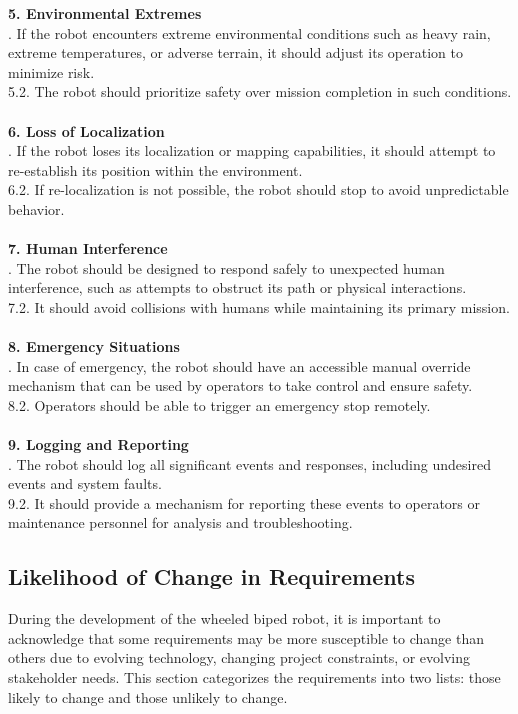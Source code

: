 \documentclass[12pt]{article}
\begin{document}
\noindent\textbf{5. Environmental Extremes}\\
. If the robot encounters extreme environmental conditions such as heavy rain, extreme temperatures, or adverse terrain, it should adjust its operation to minimize risk.\\
5.2. The robot should prioritize safety over mission completion in such conditions.\\\\
\noindent\textbf{6. Loss of Localization}\\
. If the robot loses its localization or mapping capabilities, it should attempt to re-establish its position within the environment.\\
6.2. If re-localization is not possible, the robot should stop to avoid unpredictable behavior.\\\\
\noindent\textbf{7. Human Interference}\\
. The robot should be designed to respond safely to unexpected human interference, such as attempts to obstruct its path or physical interactions.\\
7.2. It should avoid collisions with humans while maintaining its primary mission.\\\\
\noindent\textbf{8. Emergency Situations}\\
. In case of emergency, the robot should have an accessible manual override mechanism that can be used by operators to take control and ensure safety.\\
8.2. Operators should be able to trigger an emergency stop remotely.\\\\
\noindent\textbf{9. Logging and Reporting}\\
. The robot should log all significant events and responses, including undesired events and system faults.\\
9.2. It should provide a mechanism for reporting these events to operators or maintenance personnel for analysis and troubleshooting.
\subsection{Likelihood of Change in Requirements}
\noindent During the development of the wheeled biped robot, it is important to acknowledge that some requirements may be more susceptible to change than others due to evolving technology, changing project constraints, or evolving stakeholder needs. This section categorizes the requirements into two lists: those likely to change and those unlikely to change.
\end{document}
